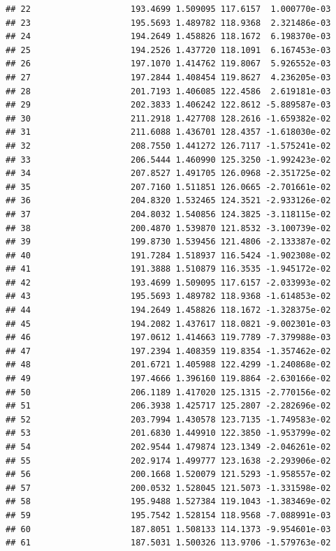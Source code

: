 \documentclass[
]{article}
\begin{document}
\begin{verbatim}
## 22                    193.4699 1.509095 117.6157  1.000770e-03
## 23                    195.5693 1.489782 118.9368  2.321486e-03
## 24                    194.2649 1.458826 118.1672  6.198370e-03
## 25                    194.2526 1.437720 118.1091  6.167453e-03
## 26                    197.1070 1.414762 119.8067  5.926552e-03
## 27                    197.2844 1.408454 119.8627  4.236205e-03
## 28                    201.7193 1.406085 122.4586  2.619181e-03
## 29                    202.3833 1.406242 122.8612 -5.889587e-03
## 30                    211.2918 1.427708 128.2616 -1.659382e-02
## 31                    211.6088 1.436701 128.4357 -1.618030e-02
## 32                    208.7550 1.441272 126.7117 -1.575241e-02
## 33                    206.5444 1.460990 125.3250 -1.992423e-02
## 34                    207.8527 1.491705 126.0968 -2.351725e-02
## 35                    207.7160 1.511851 126.0665 -2.701661e-02
## 36                    204.8320 1.532465 124.3521 -2.933126e-02
## 37                    204.8032 1.540856 124.3825 -3.118115e-02
## 38                    200.4870 1.539870 121.8532 -3.100739e-02
## 39                    199.8730 1.539456 121.4806 -2.133387e-02
## 40                    191.7284 1.518937 116.5424 -1.902308e-02
## 41                    191.3888 1.510879 116.3535 -1.945172e-02
## 42                    193.4699 1.509095 117.6157 -2.033993e-02
## 43                    195.5693 1.489782 118.9368 -1.614853e-02
## 44                    194.2649 1.458826 118.1672 -1.328375e-02
## 45                    194.2082 1.437617 118.0821 -9.002301e-03
## 46                    197.0612 1.414663 119.7789 -7.379988e-03
## 47                    197.2394 1.408359 119.8354 -1.357462e-02
## 48                    201.6721 1.405988 122.4299 -1.240868e-02
## 49                    197.4666 1.396160 119.8864 -2.630166e-02
## 50                    206.1189 1.417020 125.1315 -2.770156e-02
## 51                    206.3938 1.425717 125.2807 -2.282696e-02
## 52                    203.7994 1.430578 123.7135 -1.749583e-02
## 53                    201.6830 1.449910 122.3850 -1.953799e-02
## 54                    202.9544 1.479874 123.1349 -2.046261e-02
## 55                    202.9174 1.499777 123.1638 -2.293906e-02
## 56                    200.1668 1.520079 121.5293 -1.958557e-02
## 57                    200.0532 1.528045 121.5073 -1.331598e-02
## 58                    195.9488 1.527384 119.1043 -1.383469e-02
## 59                    195.7542 1.528154 118.9568 -7.088991e-03
## 60                    187.8051 1.508133 114.1373 -9.954601e-03
## 61                    187.5031 1.500326 113.9706 -1.579763e-02

\end{verbatim}
\end{document}
